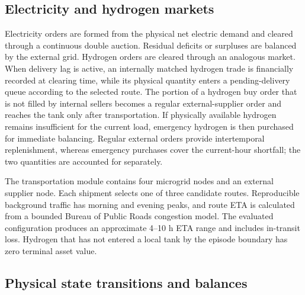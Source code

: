 \documentclass[final,5p,times]{elsarticle}
\begin{document}
\subsection{Electricity and hydrogen markets}

Electricity orders are formed from the physical net electric demand and cleared through a continuous double auction. Residual deficits or surpluses are balanced by the external grid. Hydrogen orders are cleared through an analogous market. When delivery lag is active, an internally matched hydrogen trade is financially recorded at clearing time, while its physical quantity enters a pending-delivery queue according to the selected route. The portion of a hydrogen buy order that is not filled by internal sellers becomes a regular external-supplier order and reaches the tank only after transportation. If physically available hydrogen remains insufficient for the current load, emergency hydrogen is then purchased for immediate balancing. Regular external orders provide intertemporal replenishment, whereas emergency purchases cover the current-hour shortfall; the two quantities are accounted for separately.

The transportation module contains four microgrid nodes and an external supplier node. Each shipment selects one of three candidate routes. Reproducible background traffic has morning and evening peaks, and route ETA is calculated from a bounded Bureau of Public Roads congestion model. The evaluated configuration produces an approximate 4--10 h ETA range and includes in-transit loss. Hydrogen that has not entered a local tank by the episode boundary has zero terminal asset value.

\subsection{Physical state transitions and balances}
\label{sec:physical_transitions}
\end{document}
